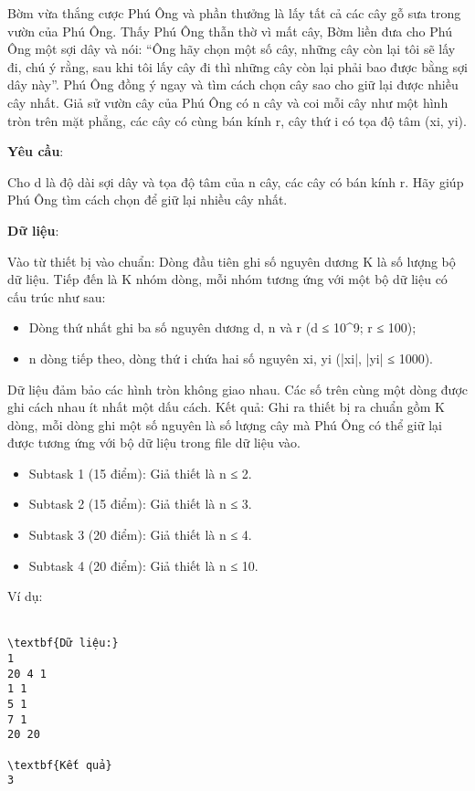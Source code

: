 

Bờm vừa thắng cược Phú Ông và phần thưởng là lấy tất cả các cây gỗ sưa trong vườn của Phú Ông. Thấy Phú Ông thẫn thờ vì mất cây, Bờm liền đưa cho Phú Ông một sợi dây và nói: “Ông hãy chọn một số cây, những cây còn lại tôi sẽ lấy đi, chú ý rằng, sau khi tôi lấy cây đi thì những cây còn lại phải bao được bằng sợi dây này”. Phú Ông đồng ý ngay và tìm cách chọn cây sao cho giữ lại được nhiều cây nhất. Giả sử vườn cây của Phú Ông có n cây và coi mỗi cây như một hình tròn trên mặt phẳng, các cây có cùng bán kính r, cây thứ i có tọa độ tâm (xi, yi).

\textbf{Yêu cầu}:

Cho d là độ dài sợi dây và tọa độ tâm của n cây, các cây có bán kính r. Hãy giúp Phú Ông tìm cách chọn để giữ lại nhiều cây nhất.

\textbf{Dữ liệu}:

Vào từ thiết bị vào chuẩn: Dòng đầu tiên ghi số nguyên dương K là số lượng bộ dữ liệu. Tiếp đến là K nhóm dòng, mỗi nhóm tương ứng với một bộ dữ liệu có cấu trúc như sau:
\begin{itemize}
	\item Dòng thứ nhất ghi ba số nguyên dương d, n và r (d ≤ 10^9; r ≤ 100);
	\item n dòng tiếp theo, dòng thứ i chứa hai số nguyên xi, yi (|xi|, |yi| ≤ 1000).
\end{itemize}

Dữ liệu đảm bảo các hình tròn không giao nhau. Các số trên cùng một dòng được ghi cách nhau ít nhất một dấu cách. Kết quả: Ghi ra thiết bị ra chuẩn gồm K dòng, mỗi dòng ghi một số nguyên là số lượng cây mà Phú Ông có thể giữ lại được tương ứng với bộ dữ liệu trong file dữ liệu vào.
\begin{itemize}
	\item Subtask 1 (15 điểm): Giả thiết là n ≤ 2.
	\item Subtask 2 (15 điểm): Giả thiết là n ≤ 3.
	\item Subtask 3 (20 điểm): Giả thiết là n ≤ 4.
	\item Subtask 4 (20 điểm): Giả thiết là n ≤ 10.
\end{itemize}Ví dụ:
\\​
\begin{verbatim}
\textbf{Dữ liệu:}
1
20 4 1
1 1
5 1
7 1
20 20

\textbf{Kết quả}
3\end{verbatim}
